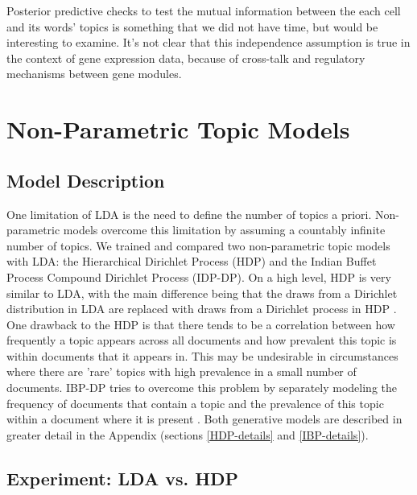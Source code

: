\documentclass{article}
\begin{document}
Posterior predictive checks to test the mutual information between the each cell and its words' topics is something that we did not have time, but would be interesting to examine. It's not clear that this independence assumption is true in the context of gene expression data, because of cross-talk and regulatory mechanisms between gene modules.

\section{Non-Parametric Topic Models} 
\label{nonparametricsec}
\subsection{Model Description}
One limitation of LDA is the need to define the number of topics a priori. Non-parametric models overcome this limitation by assuming a countably infinite number of topics. We trained and compared two non-parametric topic models with LDA: the Hierarchical Dirichlet Process (HDP) and the Indian Buffet Process Compound Dirichlet Process (IDP-DP). On a high level, HDP is very similar to LDA, with the main difference being that the draws from a Dirichlet distribution in LDA are replaced with draws from a Dirichlet process in HDP \cite{HDP}. One drawback to the HDP is that there tends to be a correlation between how frequently a topic appears across all documents and how prevalent this topic is within documents that it appears in. This may be undesirable in circumstances where there are 'rare' topics with high prevalence in a small number of documents. IBP-DP tries to overcome this problem by separately modeling the frequency of documents that contain a topic and the prevalence of this topic within a document where it is present \cite{HDP}. Both generative models are described in greater detail in the Appendix (sections \ref{HDP-details} and \ref{IBP-details}).

\subsection{Experiment: LDA vs. HDP}
\end{document}
